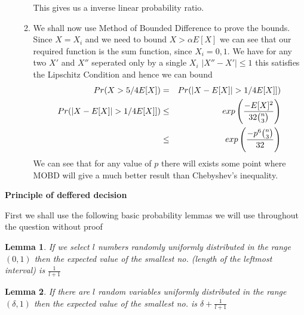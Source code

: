\documentclass{assignment}
\newtheorem{lemma}{Lemma}
\begin{document}
\begin{problemlist}
\begin{problem}
\begin{answer}
\begin{enumerate}
\begin{enumerate}
This gives us a inverse linear probability ratio. 
\item We shall now use Method of Bounded Difference to prove the bounds. Since $X = X_i$ and we need to bound $X>\alpha E[X]$ we can see that our required function is the sum function, since $X_i = {0,1}$. We have for any two $X'$ and $X''$ seperated only by a single $X_i$ $|X''-X'|\leq 1$ this satisfies the Lipschitz Condition and hence we can bound 
\begin{eqnarray}
 Pr (X > 5/4 E[X]) & = & Pr(|X-E[X]|> 1/4 E[X]]) \\
Pr(|X-E[X]|> 1/4 E[X]]) & \leq & exp \left({-E[X]^2 \over 32 \binom{n}{3} } \right) \\
& \leq & exp \left( {-p^6 \binom{n}{3} \over 32 } \right)
\end{eqnarray}
We can see that for any value of $p$ there will exists some point where MOBD will give a much better result than Chebyshev's inequality. 
\end{enumerate}
\end{enumerate}

\end{answer}
\end{problem}
\pbitem
\begin{problem}
 \textbf{Principle of deffered decision}
\begin{answer}
First we shall use the following basic probability lemmas we will use throughout the question without proof
\begin{lemma}
 If we select $l$ numbers randomly uniformly distributed in the range $(0,1)$ then the expected value of the smallest no. (length of the leftmost interval) is $\frac{1}{l+1}$
\end{lemma}

\begin{lemma}
 If there are $l$ random variables uniformly distributed in the range $(\delta,1)$ then the expected value of the smallest no. is $\delta + \frac{1}{l+1}$
\end{lemma}


\end{answer}
\end{problem}
\end{problemlist}
\end{document}
